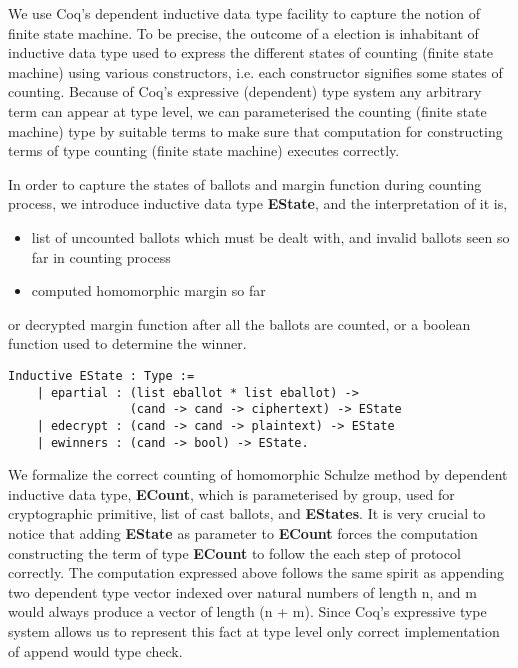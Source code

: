 \documentclass{llncs}
\begin{document}
We use Coq's dependent inductive data type facility to capture the notion of 
  finite state machine. To  be precise, the outcome
  of a election
 is inhabitant of inductive data type used to express the 
  different states of counting (finite state machine) using various constructors, 
  i.e. each constructor signifies some states of counting. Because of Coq's
  expressive (dependent) type system any arbitrary term can appear at type level, 
  we can  parameterised the counting (finite state machine) type by suitable 
  terms to  make sure that computation for constructing terms of type counting (finite 
  state machine) executes correctly.
 
  
 
 In order to capture the states of ballots and margin function during counting process, 
 we introduce inductive data type \textbf{EState}, and the interpretation of it is,  
  \begin{itemize}
  \item list of uncounted ballots which must be dealt with, 
  	and invalid ballots seen so far in counting process
  \item computed homomorphic margin so far
  \end{itemize}
  or decrypted margin function after all the ballots are counted, 
  or a boolean function used to determine the winner.
  
  
  
\begin{verbatim}
Inductive EState : Type :=
    | epartial : (list eballot * list eballot) ->
                 (cand -> cand -> ciphertext) -> EState
    | edecrypt : (cand -> cand -> plaintext) -> EState
    | ewinners : (cand -> bool) -> EState.
\end{verbatim}

We formalize the correct counting of homomorphic Schulze method by dependent inductive 
data type, \textbf{ECount}, which is parameterised by group, used for cryptographic 
primitive, list of cast ballots, and \textbf{EStates}. It is very crucial to 
notice that adding  \textbf{EState} as parameter to \textbf{ECount} forces the
 computation constructing the term of type \textbf{ECount} to follow the each step of protocol
  correctly. The computation expressed above follows 
  the same spirit as appending two dependent type 
  vector indexed over natural numbers of length n, and m would always 
  produce a vector of length  (n + m). Since Coq's expressive type system allows 
  us to represent this fact at type level only correct implementation of 
  append would type check.
\end{document}
